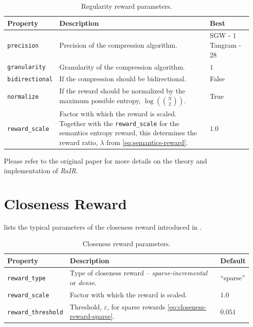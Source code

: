 \begin{table}[H]
    \centering
    \caption{Regularity reward parameters.}
    \begin{tabularx}{\textwidth}{C{3.9cm} L C{2.1cm}}
        \hline
        Property & Description & Best\\
        \hline
        \texttt{precision} & Precision of the compression algorithm. & SGW - \(1\) Tangram - \(28\)\\
        \texttt{granularity} & Granularity of the compression algorithm. & \(1\)\\
        \texttt{bidirectional} & If the compression should be bidirectional. & False\\
        \texttt{normalize} & If the reward should be normalized by the maximum possible entropy, \(\log\left(\binom{N}{2}\right)\). & True\\
        \texttt{reward\_scale} & Factor with which the reward is scaled. Together with the \texttt{reward\_scale} for the semantics entropy reward, this determines the reward ratio, \(\lambda\) from \eqref{eq:semantics-reward}. & \(1.0\)\\
        \hline
    \end{tabularx}
    \label{tab:regularity-reward-params}
\end{table}

Please refer to the original paper \citep{rair} for more details on the theory and implementation of \emph{RaIR}.

\section{Closeness Reward}
\label{sec:closeness-reward-details}

 lists the typical parameters of the closeness reward introduced in .
\begin{table}[H]
    \centering
    \caption{Closeness reward parameters.}
    \begin{tabularx}{\textwidth}{C{3.9cm} L C{2.1cm}}
        \hline
        Property & Description & Default\\
        \hline
        \texttt{reward\_type} & Type of closeness reward -- \emph{sparse-incremental} or \emph{dense}. & ``sparse''\\
        \texttt{reward\_scale} & Factor with which the reward is scaled. & \(1.0\)\\
        \texttt{reward\_threshold} & Threshold, \(\varepsilon\), for sparse rewards \eqref{eq:closeness-reward-sparse}. & \(0.051\)\\
        \hline
    \end{tabularx}
    \label{tab:closeness-reward-params}
\end{table}

